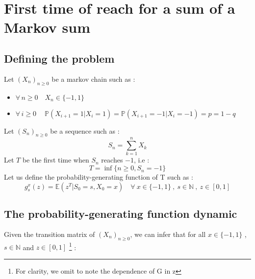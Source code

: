 \documentclass{article}
\begin{document}
\section{First time of reach for a sum of a Markov sum}

\subsection{Defining the problem}

Let $(X_{n})_{n\geq0}$ be a markov chain such as :
\begin{itemize}
\item $\forall \, n\geq0 \quad X_{n} \in \{-1,1\} $ 
\item $\forall \, i\geq0 \quad\ \mathbb{P}( X_{i+1}=1 | X_{i}=1 ) = \mathbb{P}( X_{i+1}=-1 | X_{i}=-1 ) = p = 1-q$
\end{itemize}
Let $(S_{n})_{n\geq0}$ be a sequence such as :
$$ S_{n} = \sum_{k=1}^{n}X_{k} $$
Let $T$ be the first time when $S_{n}$ reaches $-1$, i.e  :
$$ T= \inf \{ n\geq0 , S_{n}=-1   \} $$
Let us define the  probability-generating function of T such as :
$$ g_{s}^{x}(z) = \mathbb{E}(z^{T} | S_{0}=s, X_{0}=x) \quad \forall \ x \in \{-1,1\} \ , \ s \in \mathbb{N} \ , \ z \in [0,1]  $$

\subsection{The probability-generating function dynamic}
Given the transition matrix of $(X_{n})_{n\geq0}$, we can infer that for all $x \in \{-1,1\}$ , $s \in \mathbb{N}$ and $z \in [0,1]$ \footnote{For clarity, we omit to note the dependence of G in z} :
\end{document}
